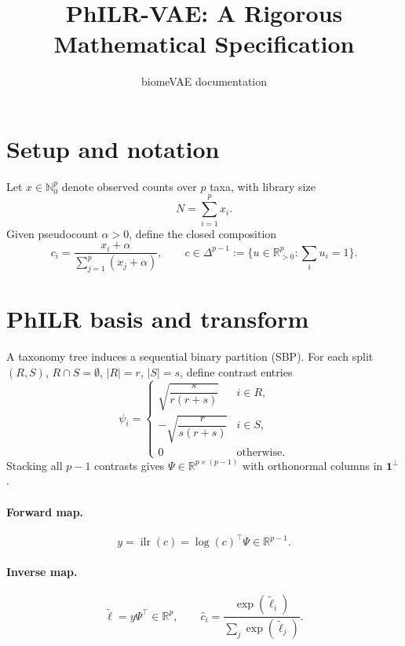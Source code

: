 \documentclass[11pt]{article}
\title{PhILR-VAE: A Rigorous Mathematical Specification}
\author{biomeVAE documentation}
\date{}
\begin{document}
\maketitle

\section{Setup and notation}
Let $x\in\mathbb{N}_0^p$ denote observed counts over $p$ taxa, with library size
\begin{equation}
N=\sum_{i=1}^p x_i.
\end{equation}
Given pseudocount $\alpha>0$, define the closed composition
\begin{equation}
c_i=\frac{x_i+\alpha}{\sum_{j=1}^p (x_j+\alpha)},
\qquad c\in\Delta^{p-1}:=\{u\in\mathbb{R}_{>0}^p:\sum_i u_i=1\}.
\end{equation}

\section{PhILR basis and transform}
A taxonomy tree induces a sequential binary partition (SBP). For each split $(R,S)$, $R\cap S=\emptyset$, $|R|=r$, $|S|=s$, define contrast entries
\begin{equation}
\psi_i=
\begin{cases}
\sqrt{\dfrac{s}{r(r+s)}} & i\in R,\\[4pt]
-\sqrt{\dfrac{r}{s(r+s)}} & i\in S,\\[4pt]
0 & \text{otherwise}.
\end{cases}
\end{equation}
Stacking all $p-1$ contrasts gives $\Psi\in\mathbb{R}^{p\times(p-1)}$ with orthonormal columns in $\mathbf{1}^\perp$.

\paragraph{Forward map.}
\begin{equation}
y=\operatorname{ilr}(c)=\log(c)^\top\Psi\in\mathbb{R}^{p-1}.
\end{equation}

\paragraph{Inverse map.}
\begin{equation}
\tilde\ell = y\Psi^\top\in\mathbb{R}^p,
\qquad
\hat c_i=\frac{\exp(\tilde\ell_i)}{\sum_j \exp(\tilde\ell_j)}.
\end{equation}
\end{document}
